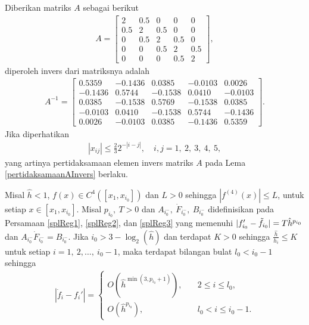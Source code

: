 \begin{contoh}
    Diberikan matriks $A$ sebagai berikut
    \begin{gather*}
        A=\begin{bmatrix}
            2 & 0.5 & 0 & 0 & 0 \\
            0.5 & 2 & 0.5 & 0 & 0\\
            0 & 0.5 & 2 & 0.5 & 0\\
            0 & 0 & 0.5 & 2 & 0.5 \\
            0 & 0 & 0 & 0.5 & 2
        \end{bmatrix},
    \end{gather*}
    diperoleh invers dari matriksnya adalah
    \begin{gather*}
    A^{-1}=\begin{bmatrix}
        0.5359 & -0.1436 & 0.0385 & -0.0103 & 0.0026 \\
        -0.1436 & 0.5744 & -0.1538 & 0.0410 & -0.0103\\
        0.0385 & -0.1538 & 0.5769 & -0.1538 & 0.0385\\
        -0.0103 & 0.0410 & -0.1538 & 0.5744 & -0.1436 \\
        0.0026 & -0.0103 & 0.0385 & -0.1436 & 0.5359
    \end{bmatrix}.
    \end{gather*}
    Jika diperhatikan 
    \begin{gather*}
        |x_{ij}| \leq \frac{2}{3} 2^{-|i-j|},\quad  i,j=1,~2,~3,~4,~5,
    \end{gather*}
    yang artinya pertidaksamaan elemen invers matriks $A$ pada Lema \ref{pertidaksamaanAInvers} berlaku.
\end{contoh}

\begin{proposisi}\label{prpsi_l0}
Misal $\hat{h} < 1$, $f(x) \in C^4([x_1,x_{i_0}])$ dan $L > 0$ sehingga $|f^{(4)}(x)| \leq L$, untuk setiap $x\in[x_1,x_{i_0}]$. Misal $p_{i_0},~T>0$ dan $A_{i_0^-},~\dot{F}_{i_0^-},~B_{i_0^-}$ didefinisikan pada Persamaan \eqref{splReg1}, \eqref{splReg2}, dan \eqref{splReg3} yang memenuhi $|f_{i_0}'-\Tilde{f}_{i_0}|=T\hat{h}^{p_{i_0}}$ dan $A_{i_0^-}\dot{F}_{i_0^-} = B_{i_0^-}$. Jika $i_0 > 3 - \log_2(\hat{h})$ dan terdapat $K>0$ sehingga $\frac{\hat{h}}{h_i} \leq K$ untuk setiap $i=1,~2,\dots,~i_0-1$, maka terdapat bilangan bulat $l_0<i_0-1$ sehingga
\begin{align*}
    |\dot{f}_i-f_i'|=
\begin{cases}
O(\hat{h}^{\min(3,p_{i_0}+1)}), \quad &2 \leq i\leq l_0,\\
O(\hat{h}^{p_{i_0}}), &l_0<i\leq i_0-1.
\end{cases}
\end{align*}
\end{proposisi}

